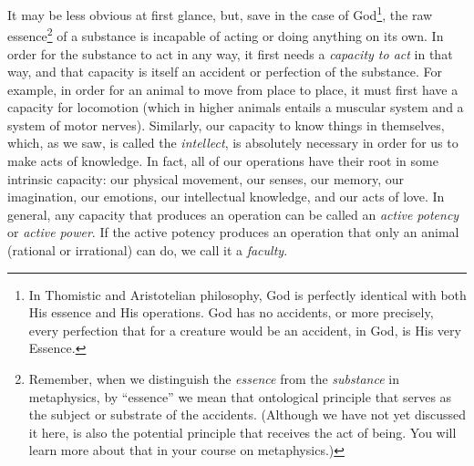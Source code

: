 \documentclass[
  12pt,
]{memoir}
\begin{document}
It may be less obvious at first glance, but, save in the case of
God\footnote{In Thomistic and Aristotelian philosophy, God is perfectly
  identical with both His essence and His operations. God has no
  accidents, or more precisely, every perfection that for a creature
  would be an accident, in God, is His very Essence.}, the raw
essence\footnote{Remember, when we distinguish the \emph{essence} from
  the \emph{substance} in metaphysics, by ``essence'' we mean that
  ontological principle that serves as the subject or substrate of the
  accidents. (Although we have not yet discussed it here, is also the
  potential principle that receives the act of being. You will learn
  more about that in your course on metaphysics.)} of a substance is
incapable of acting or doing anything on its own. In order for the
substance to act in any way, it first needs a \emph{capacity to act} in
that way, and that capacity is itself an accident or perfection of the
substance. For example, in order for an animal to move from place to
place, it must first have a capacity for locomotion (which in higher
animals entails a muscular system and a system of motor nerves).
Similarly, our capacity to know things in themselves, which, as we saw,
is called the \emph{intellect}, is absolutely necessary in order for us
to make acts of knowledge. In fact, all of our operations have their
root in some intrinsic capacity: our physical movement, our senses, our
memory, our imagination, our emotions, our intellectual knowledge, and
our acts of love. In general, any capacity that produces an operation
can be called an \emph{active potency} or \emph{active power}. If the
active potency produces an operation that only an animal (rational or
irrational) can do, we call it a \emph{faculty}.
\end{document}
